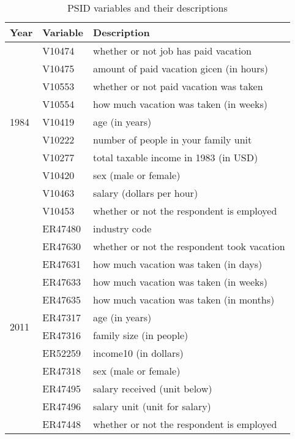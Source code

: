 \documentclass{article}
\begin{document}
    \setlength{\extrarowheight}{3pt}
    \begin{table}[h]
    \centering
    \hspace*{-1.5cm}
    \begin{tabular}{l|l|l}
        Year & Variable & Description \\ \hline \hline
      \multirow{9}{*}{1984}
        & V10474 & whether or not job has paid vacation      \\ \cline{2-3}
        & V10475 & amount of paid vacation gicen (in hours)  \\ \cline{2-3}
        & V10553 & whether or not paid vacation was taken    \\ \cline{2-3}
        & V10554 & how much vacation was taken (in weeks)    \\ \cline{2-3}
        & V10419 & age (in years)                            \\ \cline{2-3}
        & V10222 & number of people in your family unit      \\ \cline{2-3}
        & V10277 & total taxable income in 1983 (in USD)     \\ \cline{2-3}
        & V10420 & sex (male or female)                      \\ \cline{2-3}
        & V10463 & salary (dollars per hour)                 \\ \cline{2-3}
        & V10453 & whether or not the respondent is employed \\ \hline
      \multirow{12}{*}{2011}
        & ER47480 & industry code                               \\ \cline{2-3}
        & ER47630 & whether or not the respondent took vacation \\ \cline{2-3}
        & ER47631 & how much vacation was taken (in days)       \\ \cline{2-3}
        & ER47633 & how much vacation was taken (in weeks)      \\ \cline{2-3}
        & ER47635 & how much vacation was taken (in months)     \\ \cline{2-3}
        & ER47317 & age (in years)                              \\ \cline{2-3}
        & ER47316 & family size (in people)                     \\ \cline{2-3}
        & ER52259 & income10 (in dollars)                       \\ \cline{2-3}
        & ER47318 & sex (male or female)                        \\ \cline{2-3}
        & ER47495 & salary received (unit below)                \\ \cline{2-3}
        & ER47496 & salary unit (unit for salary)               \\ \cline{2-3}
        & ER47448 & whether or not the respondent is employed   \\ \hline
    \end{tabular}
    \hspace*{-1.5cm}
    \caption{PSID variables and their descriptions}
    \end{table}
\end{document}
